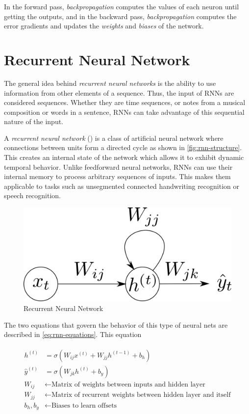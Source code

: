 In the forward pass, \textit{backpropagation} computes the values of
each neuron until getting the outputs, and in the backward pass,
\textit{backpropagation} computes the error gradients and updates the
\textit{weights} and \textit{biases} of the network.

\section{Recurrent Neural Network}
\label{sec:rnn-nets}

The general idea behind \textit{recurrent neural networks} is the
ability to use information from other elements of a sequence. Thus,
the input of RNNs are considered sequences. Whether they are time
sequences, or notes from a musical composition or words in a sentence,
RNNs can take advantage of this sequential nature of the input.

A \textit{recurrent neural network} (\cite{rumelhart1986sequential})
is a class of artificial neural network where connections between
units form a directed cycle as shown in \autoref{fig:rnn-structure}.
This creates an internal state of the network which allows it to
exhibit dynamic temporal behavior. Unlike feedforward neural networks,
RNNs can use their internal memory to process arbitrary sequences of
inputs. This makes them applicable to tasks such as unsegmented
connected handwriting recognition or speech recognition.

\begin{figure}[bth]
  \centering
  \includegraphics[width=.5\linewidth]{gfx/rnn.png}
  \caption{Recurrent Neural Network}
  \label{fig:rnn-structure}
\end{figure}

The two equations that govern the behavior of this type of neural nets
are described in \autoref{eq:rnn-equations}. This equation

\begin{align}
  \begin{split}
    \label{eq:rnn-equations}
    h^{(t)} & = \sigma(W_{ij} x^{(t)} + W_{jj} h^{(t-1)} + b_h ) \\
    \hat{y}^{(t)} & = \sigma(W_{jk} h^{(t)} + b_y ) \\
    W_{ij} & \gets \text{Matrix of weights between inputs and hidden
      layer} \\
    W_{jj} & \gets \text{Matrix of recurrent weights between hidden
      layer and itself} \\
    b_h, b_y & \gets \text{Biases to learn offsets}
  \end{split}
\end{align}

